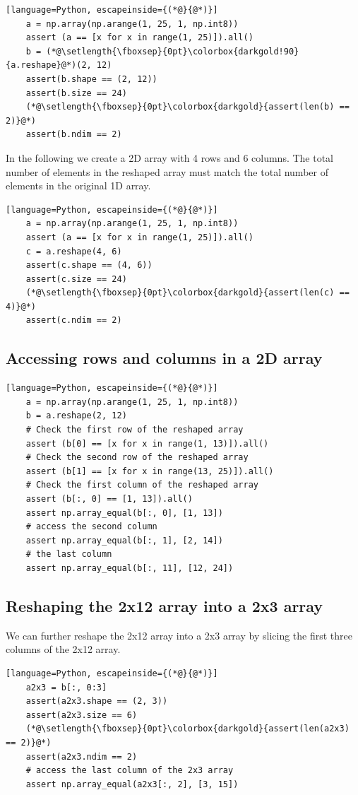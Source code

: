 \documentclass[12pt]{article}
\newcommand{\vsp}{\vspace*{8pt}}
\begin{document}
\vsp\begin{lstlisting}[language=Python, escapeinside={(*@}{@*)}]
    a = np.array(np.arange(1, 25, 1, np.int8))
    assert (a == [x for x in range(1, 25)]).all()
    b = (*@\setlength{\fboxsep}{0pt}\colorbox{darkgold!90}{a.reshape}@*)(2, 12)
    assert(b.shape == (2, 12))
    assert(b.size == 24)
    (*@\setlength{\fboxsep}{0pt}\colorbox{darkgold}{assert(len(b) == 2)}@*)
    assert(b.ndim == 2)
\end{lstlisting}

In the following we create a 2D array with 4 rows and 6 columns.
The total number of elements in the reshaped array must match
the total number of elements in the original 1D array.

\vsp\begin{lstlisting}[language=Python, escapeinside={(*@}{@*)}]
    a = np.array(np.arange(1, 25, 1, np.int8))
    assert (a == [x for x in range(1, 25)]).all()
    c = a.reshape(4, 6)
    assert(c.shape == (4, 6))
    assert(c.size == 24)
    (*@\setlength{\fboxsep}{0pt}\colorbox{darkgold}{assert(len(c) == 4)}@*)
    assert(c.ndim == 2)
\end{lstlisting}

\subsection{Accessing rows and columns in a 2D array}
\vsp\begin{lstlisting}[language=Python, escapeinside={(*@}{@*)}]
    a = np.array(np.arange(1, 25, 1, np.int8))
    b = a.reshape(2, 12)
    # Check the first row of the reshaped array
    assert (b[0] == [x for x in range(1, 13)]).all()
    # Check the second row of the reshaped array
    assert (b[1] == [x for x in range(13, 25)]).all()
    # Check the first column of the reshaped array
    assert (b[:, 0] == [1, 13]).all()
    assert np.array_equal(b[:, 0], [1, 13])
    # access the second column
    assert np.array_equal(b[:, 1], [2, 14])
    # the last column
    assert np.array_equal(b[:, 11], [12, 24])
\end{lstlisting}

\subsection{Reshaping the 2x12 array into a 2x3 array}
We can further reshape the 2x12 array into a 2x3 array by slicing the first
three columns of the 2x12 array.

\vsp\begin{lstlisting}[language=Python, escapeinside={(*@}{@*)}]
    a2x3 = b[:, 0:3]
    assert(a2x3.shape == (2, 3))
    assert(a2x3.size == 6)
    (*@\setlength{\fboxsep}{0pt}\colorbox{darkgold}{assert(len(a2x3) == 2)}@*)
    assert(a2x3.ndim == 2)
    # access the last column of the 2x3 array
    assert np.array_equal(a2x3[:, 2], [3, 15])
\end{lstlisting}
\end{document}
